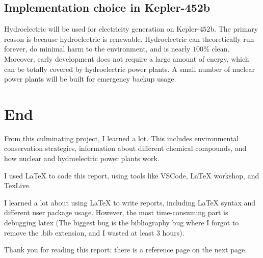 \documentclass{article}
\begin{document}
 
\subsection{Implementation choice in Kepler-452b}
Hydroelectric will be used for electricity generation on Kepler-$452$b. The primary reason is because hydroelectric is renewable. Hydroelectric can theoretically run forever, do minimal harm to the environment, and is nearly $100\%$ clean. Moreover, early development does not require a large amount of energy, which can be totally covered by hydroelectric power plants. A small number of nuclear power plants will be built for emergency backup usage. 
 
\section{End}
From this culminating project, I learned a lot. This includes environmental conservation strategies, information about different chemical compounds, and how nuclear and hydroelectric power plants work.
 
I used LaTeX to code this report, using tools like VSCode, LaTeX workshop, and TexLive.
 
I learned a lot about using LaTeX to write reports, including LaTeX syntax and different user package usage. However, the most time-consuming part is debugging latex (The biggest bug is the bibliography bug where I forgot to remove the .bib extension, and I wasted at least 3 hours). 
 
Thank you for reading this report; there is a reference page on the next page.
 
%
%
 
 
 
\newpage


\end{document}
